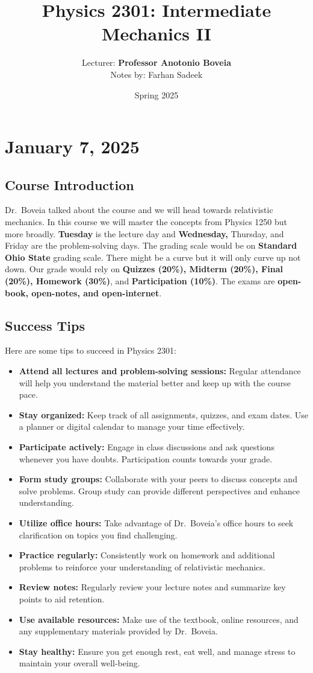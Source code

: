 \documentclass[11pt]{article}
\title{Physics 2301: Intermediate Mechanics II} \author{Lecturer: \textbf{Professor Anotonio Boveia}\\Notes by: Farhan Sadeek} \date{Spring 2025}
\begin{document}
\maketitle
\section{January 7, 2025}
\subsection{Course Introduction}

Dr.\ Boveia talked about the course and we will head towards relativistic
mechanics. In this course we will master the concepts from Physics 1250 but
more broadly. \textbf{Tuesday} is the lecture day and \textbf{Wednesday,\space}
Thursday, and Friday are the problem-solving days. The grading scale would be
on \textbf{Standard Ohio State} grading scale. There might be a curve but it
will only curve up not down. Our grade would rely on \textbf{Quizzes (20\%),
Midterm (20\%), Final (20\%), Homework (30\%)}, and \textbf{Participation (10\%)}. The exams are \textbf{open-book, open-notes, and open-internet}.

\subsection{Success Tips}
Here are some tips to succeed in Physics 2301:
\begin{itemize}
    \item \textbf{Attend all lectures and problem-solving sessions:} Regular attendance will help you understand the material better and keep up with the course pace.
    \item \textbf{Stay organized:} Keep track of all assignments, quizzes, and exam dates. Use a planner or digital calendar to manage your time effectively.
    \item \textbf{Participate actively:} Engage in class discussions and ask questions whenever you have doubts. Participation counts towards your grade.
    \item \textbf{Form study groups:} Collaborate with your peers to discuss concepts and solve problems. Group study can provide different perspectives and enhance understanding.
    \item \textbf{Utilize office hours:} Take advantage of Dr.\ Boveia's office hours to seek clarification on topics you find challenging.
    \item \textbf{Practice regularly:} Consistently work on homework and additional problems to reinforce your understanding of relativistic mechanics.
    \item \textbf{Review notes:} Regularly review your lecture notes and summarize key points to aid retention.
    \item \textbf{Use available resources:} Make use of the textbook, online resources, and any supplementary materials provided by Dr.\ Boveia.
    \item \textbf{Stay healthy:} Ensure you get enough rest, eat well, and manage stress to maintain your overall well-being.
\end{itemize}
\end{document}
